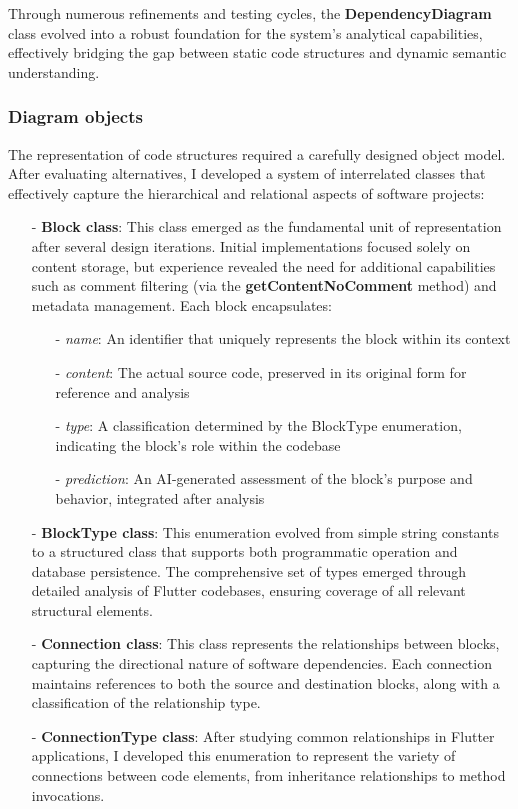 Through numerous refinements and testing cycles, the \textbf{DependencyDiagram} class evolved into a robust foundation for the system's analytical capabilities, effectively bridging the gap between static code structures and dynamic semantic understanding.

\subsubsection{Diagram objects}

The representation of code structures required a carefully designed object model. After evaluating alternatives, I developed a system of interrelated classes that effectively capture the hierarchical and relational aspects of software projects:

\begin{itemize}
    \item[-] \textbf{Block class}: This class emerged as the fundamental unit of representation after several design iterations. Initial implementations focused solely on content storage, but experience revealed the need for additional capabilities such as comment filtering (via the \textbf{getContentNoComment} method) and metadata management. Each block encapsulates:
    \begin{itemize}
        \item[-] \textit{name}: An identifier that uniquely represents the block within its context
        \item[-] \textit{content}: The actual source code, preserved in its original form for reference and analysis
        \item[-] \textit{type}: A classification determined by the BlockType enumeration, indicating the block's role within the codebase
        \item[-] \textit{prediction}: An AI-generated assessment of the block's purpose and behavior, integrated after analysis
    \end{itemize}

    \item[-] \textbf{BlockType class}: This enumeration evolved from simple string constants to a structured class that supports both programmatic operation and database persistence. The comprehensive set of types emerged through detailed analysis of Flutter codebases, ensuring coverage of all relevant structural elements.

    \item[-] \textbf{Connection class}: This class represents the relationships between blocks, capturing the directional nature of software dependencies. Each connection maintains references to both the source and destination blocks, along with a classification of the relationship type.

    \item[-] \textbf{ConnectionType class}: After studying common relationships in Flutter applications, I developed this enumeration to represent the variety of connections between code elements, from inheritance relationships to method invocations.
\end{itemize}

